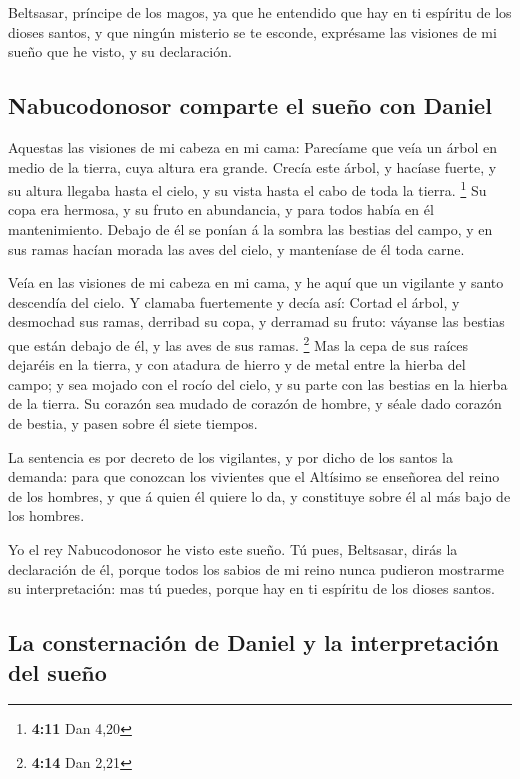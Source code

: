  Beltsasar, príncipe de los magos, ya que he entendido que
hay en ti espíritu de los dioses santos, y que ningún misterio se te
esconde, exprésame las visiones de mi sueño que he visto, y su
declaración.

\hypertarget{nabucodonosor-comparte-el-sueuxf1o-con-daniel}{%
\subsection{Nabucodonosor comparte el sueño con
Daniel}\label{nabucodonosor-comparte-el-sueuxf1o-con-daniel}}

 Aquestas las visiones de mi cabeza en mi cama: Parecíame
que veía un árbol en medio de la tierra, cuya altura era grande.
 Crecía este árbol, y hacíase fuerte, y su altura llegaba
hasta el cielo, y su vista hasta el cabo de toda la tierra. \footnote{\textbf{4:11}
  Dan 4,20}  Su copa era hermosa, y su fruto en abundancia,
y para todos había en él mantenimiento. Debajo de él se ponían á la
sombra las bestias del campo, y en sus ramas hacían morada las aves del
cielo, y manteníase de él toda carne.

 Veía en las visiones de mi cabeza en mi cama, y he aquí
que un vigilante y santo descendía del cielo.  Y clamaba
fuertemente y decía así: Cortad el árbol, y desmochad sus ramas,
derribad su copa, y derramad su fruto: váyanse las bestias que están
debajo de él, y las aves de sus ramas. \footnote{\textbf{4:14} Dan 2,21}
 Mas la cepa de sus raíces dejaréis en la tierra, y con
atadura de hierro y de metal entre la hierba del campo; y sea mojado con
el rocío del cielo, y su parte con las bestias en la hierba de la
tierra.  Su corazón sea mudado de corazón de hombre, y
séale dado corazón de bestia, y pasen sobre él siete tiempos.

 La sentencia es por decreto de los vigilantes, y por dicho
de los santos la demanda: para que conozcan los vivientes que el
Altísimo se enseñorea del reino de los hombres, y que á quien él quiere
lo da, y constituye sobre él al más bajo de los hombres.

 Yo el rey Nabucodonosor he visto este sueño. Tú pues,
Beltsasar, dirás la declaración de él, porque todos los sabios de mi
reino nunca pudieron mostrarme su interpretación: mas tú puedes, porque
hay en ti espíritu de los dioses santos.

\hypertarget{la-consternaciuxf3n-de-daniel-y-la-interpretaciuxf3n-del-sueuxf1o}{%
\subsection{La consternación de Daniel y la interpretación del
sueño}\label{la-consternaciuxf3n-de-daniel-y-la-interpretaciuxf3n-del-sueuxf1o}}

